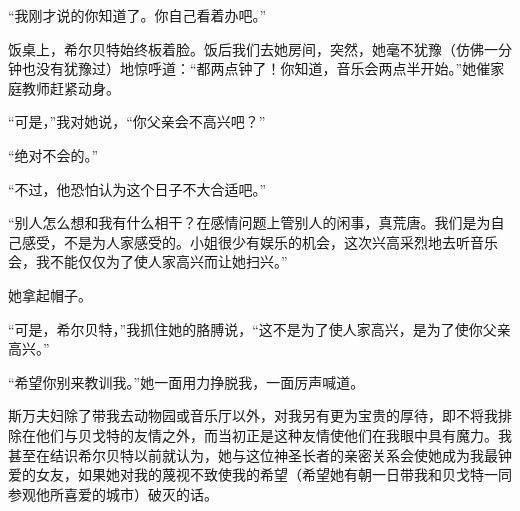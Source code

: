 \par “我刚才说的你知道了。你自己看着办吧。”
\par 饭桌上，希尔贝特始终板着脸。饭后我们去她房间，突然，她毫不犹豫（仿佛一分钟也没有犹豫过）地惊呼道：“都两点钟了！你知道，音乐会两点半开始。”她催家庭教师赶紧动身。
\par “可是，”我对她说，“你父亲会不高兴吧？”
\par “绝对不会的。”
\par “不过，他恐怕认为这个日子不大合适吧。”
\par “别人怎么想和我有什么相干？在感情问题上管别人的闲事，真荒唐。我们是为自己感受，不是为人家感受的。小姐很少有娱乐的机会，这次兴高采烈地去听音乐会，我不能仅仅为了使人家高兴而让她扫兴。”
\par 她拿起帽子。
\par “可是，希尔贝特，”我抓住她的胳膊说，“这不是为了使人家高兴，是为了使你父亲高兴。”
\par “希望你别来教训我。”她一面用力挣脱我，一面厉声喊道。
\par 斯万夫妇除了带我去动物园或音乐厅以外，对我另有更为宝贵的厚待，即不将我排除在他们与贝戈特的友情之外，而当初正是这种友情使他们在我眼中具有魔力。我甚至在结识希尔贝特以前就认为，她与这位神圣长者的亲密关系会使她成为我最钟爱的女友，如果她对我的蔑视不致使我的希望（希望她有朝一日带我和贝戈特一同参观他所喜爱的城市）破灭的话。
